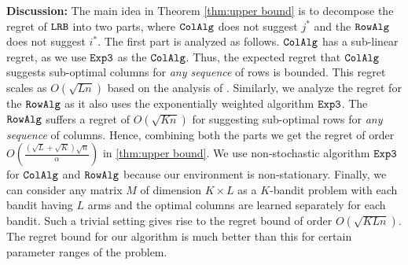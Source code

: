\textbf{Discussion:} The main idea in Theorem \ref{thm:upper bound} is to decompose the regret of ${\tt LRB}$ into two parts, where ${\tt ColAlg}$ does not suggest $j^*$ and the ${\tt RowAlg}$ does not suggest $i^*$. The first part is analyzed as follows. ${\tt ColAlg}$ has a sub-linear regret, as we use ${\tt Exp3}$ as the ${\tt ColAlg}$. Thus,  the expected regret that ${\tt ColAlg}$ suggests sub-optimal columns for \emph{any sequence} of rows is bounded. This regret scales as $O(\sqrt{L n})$ based on the analysis of \citet{auer2002nonstochastic}. Similarly, we analyze the regret for the ${\tt RowAlg}$ as it also uses the exponentially weighted algorithm ${\tt Exp3}$. The ${\tt RowAlg}$ suffers a regret of $O(\sqrt{K n})$ for suggesting sub-optimal rows for \emph{any sequence} of columns. Hence, combining both the parts we get the regret of order $O\left(\frac{\left(\sqrt{L } + \sqrt{K }\right)\sqrt{n}}{\alpha}\right)$ in \cref{thm:upper bound}. We use non-stochastic algorithm ${\tt Exp3}$ for ${\tt ColAlg}$ and ${\tt RowAlg}$ because our environment is non-stationary. Finally, we can consider any matrix $M$ of dimension $K\times L$ as a $K$-bandit problem with each bandit having $L$ arms and the optimal columns are learned separately for each bandit. Such a trivial setting gives rise to the regret bound of order $O(\sqrt{K L n})$. The regret bound for our algorithm is much better than this for certain parameter ranges of the problem.




